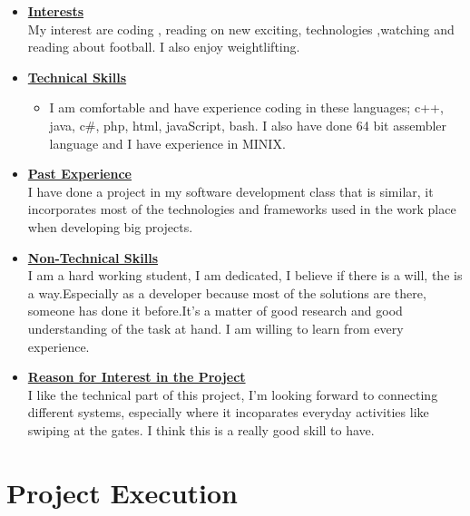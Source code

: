 \documentclass[a4paper,12pt]{article}
\begin{document}
\begin{itemize}
\item {\Large \underline{\textbf{Interests}}}\\[0.2cm]
My interest are coding , reading on new exciting, technologies ,watching and reading about football. I also enjoy weightlifting.


\item {\Large \underline{\textbf{Technical Skills}}}

	\begin{itemize}
		\item I am comfortable and have experience coding in these languages; c++, java, c\#, php, html, javaScript, bash. I also have done 64 bit assembler language and I have experience in MINIX.
	\end{itemize}
\bigskip
\item {\Large \underline{\textbf{Past Experience}}}\\[0.2cm]
I have done a project in my software development class that is similar, it incorporates  most of the technologies and frameworks used in the work place when developing big projects.
\\
\item {\Large \underline{\textbf{Non-Technical Skills}}}\\[0.2cm]
 I am a hard working student, I am dedicated, I believe if there is a will, the is a way.Especially as a developer because most of the solutions are there, someone has done it before.It's a matter of good research and good understanding of the task at hand. I am willing to learn from every experience. 
\\
\item {\Large \underline{\textbf{Reason for Interest in the Project}}}\\[0.2cm]
I like the technical part of this project, I'm looking forward to connecting different systems, especially where it incoparates everyday activities like swiping at the gates. I think this is a really good skill to have.

\end{itemize}

\newpage
\section{Project Execution}
\end{document}
